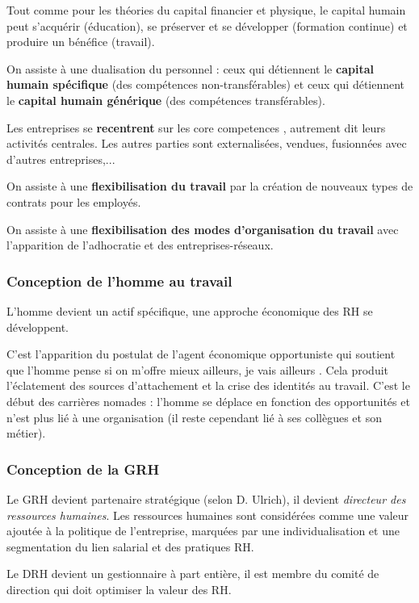 \documentclass[12pt]{article}
\begin{document}
		Tout comme pour les théories du capital financier et physique, le capital humain peut s'acquérir (éducation), se préserver et se développer (formation continue) et produire un bénéfice (travail).
		
		On assiste à une dualisation du personnel : ceux qui détiennent le \textbf{capital humain spécifique} (des compétences non-transférables) et ceux qui détiennent le \textbf{capital humain générique} (des compétences transférables).
		
		Les entreprises se \textbf{recentrent} sur les \og{} core competences \fg{}, autrement dit leurs activités centrales. Les autres parties sont externalisées, vendues, fusionnées avec d'autres entreprises,...
		
		On assiste à une \textbf{flexibilisation du travail} par la création de nouveaux types de contrats pour les employés.
		
		On assiste à une \textbf{flexibilisation des modes d'organisation du travail} avec l'apparition de l'adhocratie et des entreprises-réseaux.
		
		\subsubsection{Conception de l’homme au travail}
		
		L'homme devient un actif spécifique, une approche économique des RH se développent.
		
		C'est l'apparition du postulat de \og{} l'agent économique opportuniste \fg{} qui soutient que l'homme pense \og{} si on m'offre mieux ailleurs, je vais ailleurs \fg{}. Cela produit l'éclatement des sources d'attachement et la crise des identités au travail. C'est le début des carrières nomades : l'homme se déplace en fonction des opportunités et n'est plus lié à une organisation (il reste cependant lié à ses collègues et son métier).
		
		\subsubsection{Conception de la GRH}
		
		Le GRH devient \og{} partenaire stratégique \fg{} (selon D. Ulrich), il devient \emph{directeur des ressources humaines}. Les ressources humaines sont considérées comme une valeur ajoutée à la politique de l'entreprise, marquées par une individualisation et une segmentation du lien salarial et des pratiques RH.
		
		Le DRH devient un gestionnaire à part entière, il est membre du comité de direction qui doit optimiser la valeur des RH.
		
\end{document}
